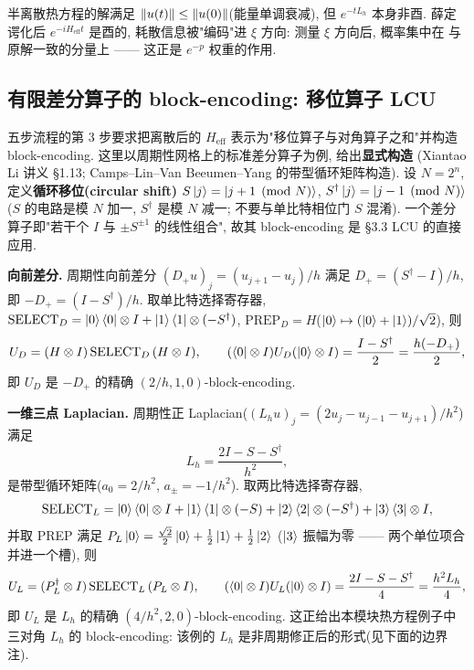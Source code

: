 \documentclass[utf8]{article} %
\numberwithin{equation}{section}   %
\newtheorem{Note}{\hskip 2em {\color{red} 注}}[subsection]
\begin{document}
\begin{Note}[耗散与酉演化的关系]
    半离散热方程的解满足 $\norm{u(t)} \le \norm{u(0)}$(能量单调衰减),
    但 $e^{-tL_h}$ 本身非酉. 薛定谔化后 $e^{-iH_{\mathrm{eff}}t}$ 是酉的,
    耗散信息被"编码"进 $\xi$ 方向: 测量 $\xi$ 方向后, 概率集中在
    与原解一致的分量上 —— 这正是 $e^{-p}$ 权重的作用.
\end{Note}

\subsection{有限差分算子的 block-encoding: 移位算子 LCU}

五步流程的第 3 步要求把离散后的 $H_{\mathrm{eff}}$ 表示为"移位算子与对角算子之和"并构造
block-encoding. 这里以周期性网格上的标准差分算子为例, 给出\textbf{显式构造}
(Xiantao Li 讲义 §1.13; Camps--Lin--Van Beeumen--Yang 的带型循环矩阵构造).
设 $N = 2^n$, 定义\textbf{循环移位(circular shift)} $S\ket{j} = \ket{j+1 \pmod N}$,
$S^\dagger\ket{j} = \ket{j-1 \pmod N}$($S$ 的电路是模 $N$ 加一, $S^\dagger$ 是模 $N$ 减一;
不要与单比特相位门 $S$ 混淆). 一个差分算子即"若干个 $I$ 与 $\pm S^{\pm 1}$ 的线性组合",
故其 block-encoding 是 §3.3 LCU 的直接应用.

\textbf{向前差分.} 周期性向前差分 $(D_+ u)_j = (u_{j+1}-u_j)/h$ 满足 $D_+ = (S^\dagger - I)/h$,
即 $-D_+ = (I-S^\dagger)/h$. 取单比特选择寄存器,
$\mathrm{SELECT}_D = \ket{0}\bra{0}\otimes I + \ket{1}\bra{1}\otimes(-S^\dagger)$,
$\mathrm{PREP}_D = H$($\ket{0}\mapsto(\ket{0}+\ket{1})/\sqrt2$), 则
\begin{equation}
    U_D = (H\otimes I)\,\mathrm{SELECT}_D\,(H\otimes I),
    \qquad
    (\bra{0}\otimes I)U_D(\ket{0}\otimes I) = \frac{I-S^\dagger}{2} = \frac{h(-D_+)}{2},
\end{equation}
即 $U_D$ 是 $-D_+$ 的精确 $(2/h, 1, 0)$-block-encoding.

\textbf{一维三点 Laplacian.} 周期性正 Laplacian($(L_h u)_j = (2u_j-u_{j-1}-u_{j+1})/h^2$)满足
\begin{equation}
    L_h = \frac{2I - S - S^\dagger}{h^2},
\end{equation}
是带型循环矩阵($a_0 = 2/h^2$, $a_{\pm} = -1/h^2$). 取两比特选择寄存器,
\begin{equation}
    \mathrm{SELECT}_L = \ket{0}\bra{0}\otimes I + \ket{1}\bra{1}\otimes(-S)
        + \ket{2}\bra{2}\otimes(-S^\dagger) + \ket{3}\bra{3}\otimes I,
\end{equation}
并取 PREP 满足 $P_L\ket{0} = \frac{\sqrt2}{2}\ket{0} + \frac12\ket{1} + \frac12\ket{2}$
($\ket{3}$ 振幅为零 —— 两个单位项合并进一个槽), 则
\begin{equation}
    U_L = (P_L^\dagger\otimes I)\,\mathrm{SELECT}_L\,(P_L\otimes I),
    \qquad
    (\bra{0}\otimes I)U_L(\ket{0}\otimes I) = \frac{2I-S-S^\dagger}{4} = \frac{h^2 L_h}{4},
\end{equation}
即 $U_L$ 是 $L_h$ 的精确 $(4/h^2, 2, 0)$-block-encoding. 这正给出本模块热方程例子中
三对角 $L_h$ 的 block-encoding: 该例的 $L_h$ 是非周期修正后的形式(见下面的边界注).
\end{document}
